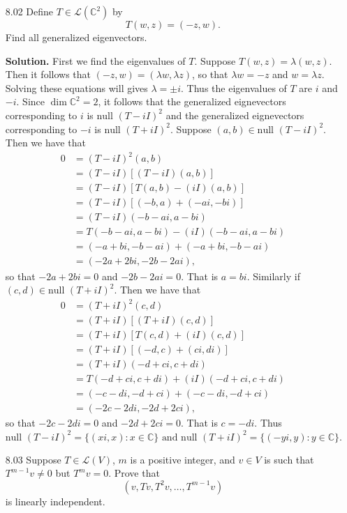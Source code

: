 \documentclass[9pt]{article}
\newcommand{\C}{\mathbb{C}}
\begin{document}
\begin{enumerate}
   \item[8.02] Define $T \in \mathcal{L}(\C^2)$ by
               $$T(w, z) = (-z, w).$$
               Find all generalized eigenvectors.
               
      \textbf{Solution.} First we find the eigenvalues of $T$. Suppose
      $T(w, z) = \lambda(w, z)$. Then it follows that
      $(-z, w) = (\lambda w, \lambda z)$, so that $\lambda w = -z$ and
      $w = \lambda z$. Solving these equations will gives $\lambda = \pm i$.
      Thus the eigenvalues of $T$ are $i$ and $-i$. Since $\dim \C^2 = 2$, it
      follows that the generalized eignevectors corresponding to $i$ is
      $\text{null }(T - iI)^2$ and the generalized eignevectors corresponding to
      $-i$ is $\text{null }(T + iI)^2$. Suppose
      $(a, b) \in \text{null }(T - iI)^2$. Then we have that
      \begin{align*}
         0 &= (T - iI)^2(a, b) \\
           &= (T - iI)[(T - iI)(a, b)] \\
           &= (T - iI)[T(a, b) - (iI)(a, b)] \\
           &= (T - iI)[(-b, a) + (-ai, -bi)] \\
           &= (T - iI)(-b - ai, a - bi) \\
           &= T(-b - ai, a - bi) - (iI)(-b - ai, a - bi) \\
           &= (-a + bi, -b - ai) + (-a + bi, -b - ai) \\
           &= (-2a + 2bi, -2b - 2ai),
      \end{align*}
      so that $-2a + 2bi = 0$ and $-2b - 2ai = 0$. That is $a = bi$. Similarly 
      if $(c, d) \in \text{null }(T + iI)^2$. Then we have that
      \begin{align*}
         0 &= (T + iI)^2(c, d) \\
           &= (T + iI)[(T + iI)(c, d)] \\
           &= (T + iI)[T(c, d) + (iI)(c, d)] \\
           &= (T + iI)[(-d, c) + (ci, di)] \\
           &= (T + iI)(-d + ci, c + di) \\
           &= T(-d + ci, c + di) + (iI)(-d + ci, c + di) \\
           &= (-c - di, -d + ci) + (-c - di, -d + ci) \\
           &= (-2c - 2di, -2d + 2ci),
      \end{align*}
      so that $-2c - 2di = 0$ and $-2d + 2ci = 0$. That is $c = -di$. Thus
      $$\text{null }(T - iI)^2 = \{(xi, x) : x \in \C\} \text{ and }
        \text{null }(T + iI)^2 = \{(-yi, y) : y \in \C\}.$$
   \item[8.03] Suppose $T \in \mathcal{L}(V)$, $m$ is a positive integer, and
               $v \in V$ is such that $T^{m-1}v \neq 0$ but $T^mv = 0$. Prove
               that
               $$(v, Tv, T^2v, \ldots, T^{m-1}v)$$
               is linearly independent.


\end{enumerate}
\end{document}
